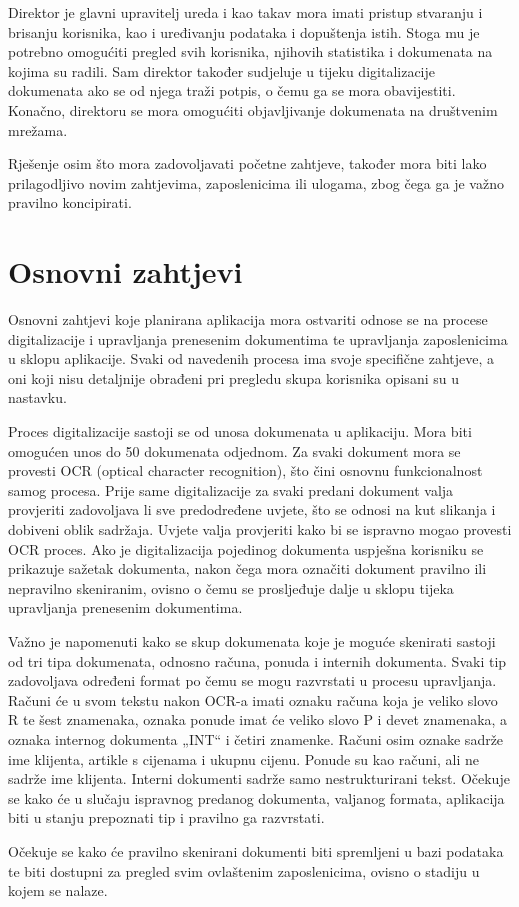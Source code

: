 		\par Direktor je glavni upravitelj ureda i kao takav mora imati pristup stvaranju i brisanju korisnika, kao i uređivanju podataka i dopuštenja istih. Stoga mu je potrebno omogućiti pregled svih korisnika, njihovih statistika i dokumenata na kojima su radili. Sam direktor također sudjeluje u tijeku digitalizacije dokumenata ako se od njega traži potpis, o čemu ga se mora obavijestiti. Konačno, direktoru se mora omogućiti objavljivanje dokumenata na društvenim mrežama.
		\par Rješenje osim što mora zadovoljavati početne zahtjeve, također mora biti lako prilagodljivo novim zahtjevima, zaposlenicima ili ulogama, zbog čega ga je važno pravilno koncipirati.
		\eject
		
		\section{Osnovni zahtjevi}
		\par Osnovni zahtjevi koje planirana aplikacija mora ostvariti odnose se na procese digitalizacije i upravljanja prenesenim dokumentima te upravljanja zaposlenicima u sklopu aplikacije. Svaki od navedenih procesa ima svoje specifične zahtjeve, a oni koji nisu detaljnije obrađeni pri pregledu skupa korisnika opisani su u nastavku.
		\par Proces digitalizacije sastoji se od unosa dokumenata u aplikaciju. Mora biti omogućen unos do 50 dokumenata odjednom. Za svaki dokument mora se provesti OCR (optical character recognition), što čini osnovnu funkcionalnost samog procesa. Prije same digitalizacije za svaki predani dokument valja provjeriti zadovoljava li sve predodređene uvjete, što se odnosi na kut slikanja i dobiveni oblik sadržaja. Uvjete valja provjeriti kako bi se ispravno mogao provesti OCR proces. Ako je digitalizacija pojedinog dokumenta uspješna korisniku se prikazuje sažetak dokumenta, nakon čega mora označiti dokument pravilno ili nepravilno skeniranim, ovisno o čemu se prosljeđuje dalje u sklopu tijeka upravljanja prenesenim dokumentima.
		\par Važno je napomenuti kako se skup dokumenata koje je moguće skenirati sastoji od tri tipa dokumenata, odnosno računa, ponuda i internih dokumenta. Svaki tip zadovoljava određeni format po čemu se mogu razvrstati u procesu upravljanja. Računi će u svom tekstu nakon OCR-a imati oznaku računa koja je veliko slovo R te šest znamenaka, oznaka ponude imat će veliko slovo P i devet znamenaka, a oznaka internog dokumenta „INT“ i četiri znamenke. Računi osim oznake sadrže ime klijenta, artikle s cijenama i ukupnu cijenu. Ponude su kao računi, ali ne sadrže ime klijenta. Interni dokumenti sadrže samo nestrukturirani tekst. Očekuje se kako će u slučaju ispravnog predanog dokumenta, valjanog formata, aplikacija biti u stanju prepoznati tip i pravilno ga razvrstati.
		\par Očekuje se kako će pravilno skenirani dokumenti biti spremljeni u bazi podataka te biti dostupni za pregled svim ovlaštenim zaposlenicima, ovisno o stadiju u kojem se nalaze. 
		\eject
		
